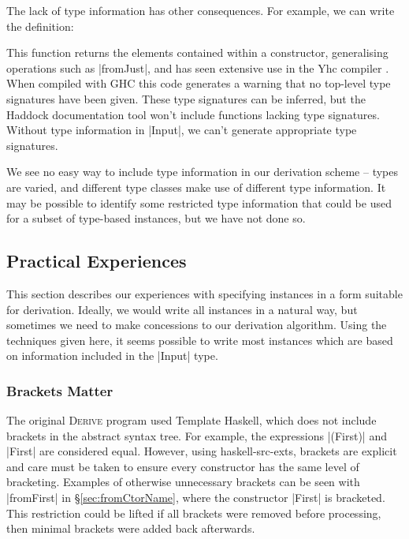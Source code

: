\documentclass{llncs}
\newcommand{\derive}{\textsc{Derive}}
\begin{document}
The lack of type information has other consequences. For example, we can write the definition:


\noindent This function returns the elements contained within a constructor, generalising operations such as |fromJust|, and has seen extensive use in the Yhc compiler \cite{yhc}. When compiled with GHC this code generates a warning that no top-level type signatures have been given. These type signatures can be inferred, but the Haddock documentation tool \cite{haddock} won't include functions lacking type signatures. Without type information in |Input|, we can't generate appropriate type signatures.

We see no easy way to include type information in our derivation scheme -- types are varied, and different type classes make use of different type information. It may be possible to identify some restricted type information that could be used for a subset of type-based instances, but we have not done so.

\subsection{Practical Experiences}

This section describes our experiences with specifying instances in a form suitable for derivation. Ideally, we would write all instances in a natural way, but sometimes we need to make concessions to our derivation algorithm. Using the techniques given here, it seems possible to write most instances which are based on information included in the |Input| type.

\subsubsection{Brackets Matter}

The original \derive{} program used Template Haskell, which does not include brackets in the abstract syntax tree. For example, the expressions |(First)| and |First| are considered equal. However, using haskell-src-exts, brackets are explicit and care must be taken to ensure every constructor has the same level of bracketing. Examples of otherwise unnecessary brackets can be seen with |fromFirst| in \S\ref{sec:fromCtorName}, where the constructor |First| is bracketed. This restriction could be lifted if all brackets were removed before processing, then minimal brackets were added back afterwards.
\end{document}
